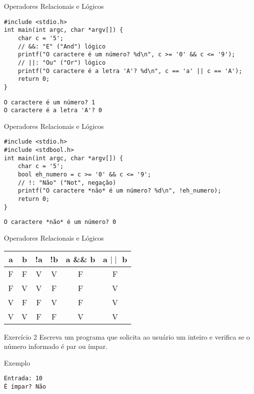 \documentclass[t, aspectratio=169]{beamer}
\begin{document}
\begin{frame}[label={sec:orgfb18d98},fragile]{Operadores Relacionais e Lógicos}
 \vspace{-0.5cm}
\begin{verbatim}
#include <stdio.h>
int main(int argc, char *argv[]) {
    char c = '5';
    // &&: "E" ("And") lógico
    printf("O caractere é um número? %d\n", c >= '0' && c <= '9');
    // ||: "Ou" ("Or") lógico
    printf("O caractere é a letra 'A'? %d\n", c == 'a' || c == 'A');
    return 0;
}
\end{verbatim}

\begin{verbatim}
O caractere é um número? 1
O caractere é a letra 'A'? 0
\end{verbatim}
\end{frame}

\begin{frame}[label={sec:org43eafdd},fragile]{Operadores Relacionais e Lógicos}
 \vspace{-0.5cm}
\begin{verbatim}
#include <stdio.h>
#include <stdbool.h>
int main(int argc, char *argv[]) {
    char c = '5';
    bool eh_numero = c >= '0' && c <= '9';
    // !: "Não" ("Not", negação)
    printf("O caractere *não* é um número? %d\n", !eh_numero);
    return 0;
}
\end{verbatim}

\begin{verbatim}
O caractere *não* é um número? 0
\end{verbatim}
\end{frame}

\begin{frame}[label={sec:orgd80e2fa}]{Operadores Relacionais e Lógicos}
\begin{center}
\begin{tabular}{cccccc}
\toprule
a & b & !a & !b & a \&\& b & a \(\mid\mid\) b\\
\midrule
F & F & V & V & F & F\\
F & V & V & F & F & V\\
V & F & F & V & F & V\\
V & V & F & F & V & V\\
\bottomrule
\end{tabular}
\end{center}
\end{frame}

\begin{frame}[label={sec:org26fc374},fragile]{Exercício 2}
 Escreva um programa que solicita ao usuário um inteiro e verifica se
o número informado é par ou ímpar.

\vspace{0.5cm}
\alert{Exemplo}
\begin{verbatim}
Entrada: 10
É ímpar? Não
\end{verbatim}
\end{frame}
\end{document}
